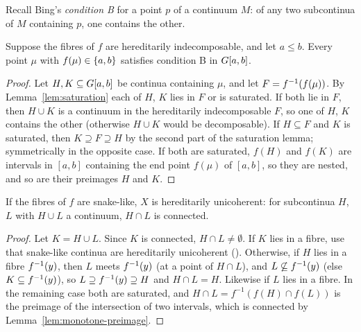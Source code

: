 
Recall Bing's \emph{condition B} for a point $p$ of a continuum $M$: of any two subcontinua of $M$ containing $p$, one contains the other.

\begin{lemma}\label{lem:condB}
Suppose the fibres of $f$ are hereditarily indecomposable, and let $a\le b$. Every point $\mu$ with $f(\mu)\in\left\{ a,b \right\}$ satisfies condition B in $G[a,b]$.
\end{lemma}

\begin{proof}
Let $H,K\subseteq G[a,b]$ be continua containing $\mu$, and let $F=f^{-1}(f(\mu))$. By Lemma~\ref{lem:saturation} each of $H$, $K$ lies in $F$ or is saturated.
If both lie in $F$, then $H\cup K$ is a continuum in the hereditarily indecomposable $F$, so one of $H$, $K$ contains the other (otherwise $H\cup K$ would
be decomposable). If $H\subseteq F$ and $K$ is saturated, then $K\supseteq F\supseteq H$ by the second part of the saturation lemma; symmetrically in the
opposite case. If both are saturated, $f(H)$ and $f(K)$ are intervals in $[a,b]$ containing the end point $f(\mu)$ of $[a,b]$, so they are nested, and so
are their preimages $H$ and $K$.
\end{proof}


\begin{proposition}\label{prop:atomic-hu}
If the fibres of $f$ are snake-like, $X$ is hereditarily unicoherent: for subcontinua $H$, $L$ with $H\cup L$ a continuum, $H\cap L$ is connected.
\end{proposition}

\begin{proof}
Let $K=H\cup L$. Since $K$ is connected, $H\cap L\neq\emptyset$. If $K$ lies in a fibre, use that snake-like continua are hereditarily unicoherent
(). Otherwise, if $H$ lies in a fibre $f^{-1}(y)$, then $L$ meets $f^{-1}(y)$ (at a point of $H\cap L$), and $L\not\subseteq f^{-1}(y)$ (else
$K\subseteq f^{-1}(y)$), so $L\supseteq f^{-1}(y)\supseteq H$ and $H\cap L=H$. Likewise if $L$ lies in a fibre. In the remaining case both are saturated, and
$H\cap L=f^{-1}(f(H)\cap f(L))$ is the preimage of the intersection of two intervals, which is connected by Lemma~\ref{lem:monotone-preimage}.
\end{proof}

